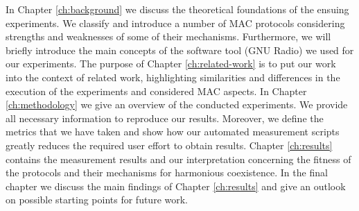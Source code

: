 In Chapter \ref{ch:background} we discuss the theoretical foundations of the ensuing experiments. We classify and introduce a number of MAC protocols considering strengths and weaknesses of some of their mechanisms. Furthermore, we will briefly introduce the main concepts of the software tool (GNU Radio) we used for our experiments. The purpose of Chapter \ref{ch:related-work} is to put our work into the context of related work, highlighting similarities and differences in the execution of the experiments and considered MAC aspects.
In Chapter \ref{ch:methodology} we give an overview of the conducted experiments. We provide all necessary information to reproduce our results. Moreover, we define the metrics that we have taken and show how our automated measurement scripts greatly reduces the required user effort to obtain results.
Chapter \ref{ch:results} contains the measurement results and our interpretation concerning the fitness of the protocols and their mechanisms for harmonious coexistence. 
In the final chapter we discuss the main findings of Chapter \ref{ch:results} and give an outlook on possible starting points for future work.
